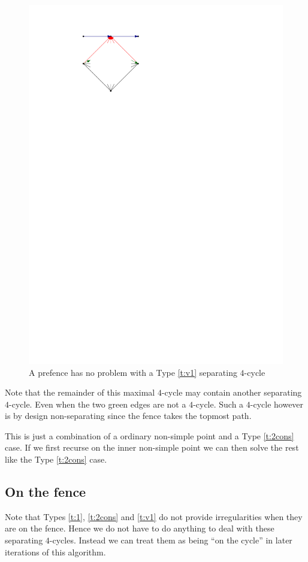   \begin{figure}[h]
    \centering
    \includegraphics[scale=1]{4cycles/img/cycle_e}
    \caption{A prefence has no problem with a Type \ref{t:v1} separating $4$-cycle}
    \label{fig:4c:v1}
  \end{figure}

  Note that the remainder of this maximal $4$-cycle may contain another separating $4$-cycle. Even when the two green edges are not a $4$-cycle. Such a $4$-cycle however is by design non-separating since the fence takes the topmost path.

  This is just a combination of a ordinary non-simple point and a Type \ref{t:2cons} case. If we first recurse on the inner non-simple point we can then solve the rest like the Type \ref{t:2cons} case.

\subsection{On the fence}
  Note that Types \ref{t:1}, \ref{t:2cons} and \ref{t:v1} do not provide irregularities when they are on the fence. Hence we do not have to do anything to deal with these separating $4$-cycles. Instead we can treat them as being ``on the cycle'' in later iterations of this algorithm.

